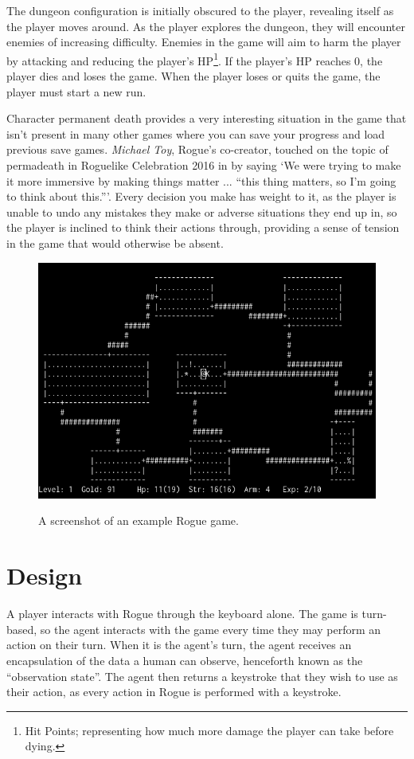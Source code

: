 \documentclass[11pt,a4paper]{article}
\begin{document}
The dungeon configuration is initially obscured to the player, revealing itself as the player moves around. As the player explores the dungeon, they will encounter enemies of increasing difficulty. Enemies in the game will aim to harm the player by attacking and reducing the player's HP\footnote{Hit Points; representing how much more damage the player can take before dying.}. If the player's HP reaches 0, the player dies and loses the game. When the player loses or quits the game, the player must start a new run.

Character permanent death provides a very interesting situation in the game that isn't present in many other games where you can save your progress and load previous save games. \emph{Michael Toy}, Rogue's co-creator, touched on the topic of permadeath in Roguelike Celebration 2016 in \cite{gamasutra16} by saying `We were trying to make it more immersive by making things matter ... ``this thing matters, so I'm going to think about this.'''. Every decision you make has weight to it, as the player is unable to undo any mistakes they make or adverse situations they end up in, so the player is inclined to think their actions through, providing a sense of tension in the game that would otherwise be absent.

\begin{figure}[t]
	\caption{A screenshot of an example Rogue game.}
	\centering
	\includegraphics[scale=0.5]{rogue_screenshot}
	\label{rogsc}
\end{figure}

\section{Design}
A player interacts with Rogue through the keyboard alone. The game is turn-based, so the agent interacts with the game every time they may perform an action on their turn. When it is the agent's turn, the agent receives an encapsulation of the data a human can observe, henceforth known as the ``observation state''. The agent then returns a keystroke that they wish to use as their action, as every action in Rogue is performed with a keystroke.
\end{document}
